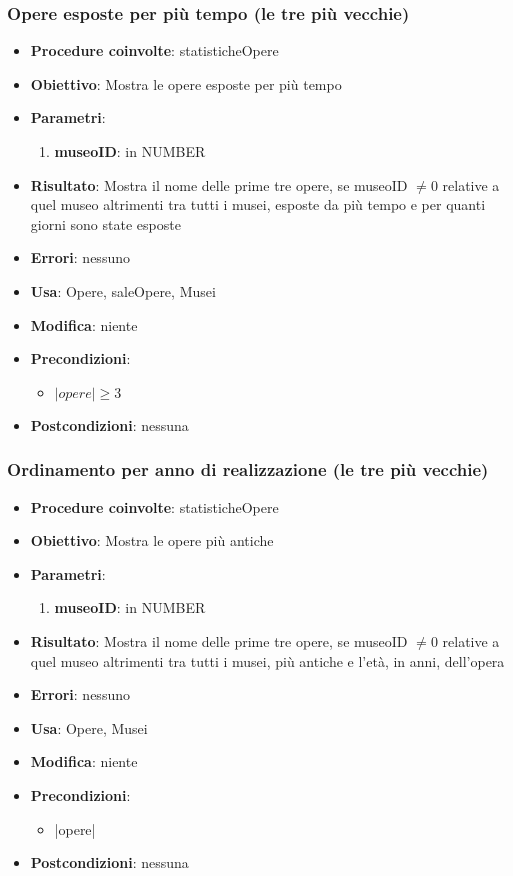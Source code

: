 \subsubsection{Opere esposte per più tempo (le tre più vecchie)}
\begin{itemize}
	\item \textbf{Procedure coinvolte}: statisticheOpere
	\item \textbf{Obiettivo}: Mostra le opere esposte per più tempo
	\item \textbf{Parametri}:
	\begin{enumerate}
		\item \textbf{museoID}: in NUMBER
	\end{enumerate}
	\item \textbf{Risultato}: Mostra il nome delle prime tre opere, se museoID $\neq 0$ relative a quel museo altrimenti tra tutti i musei, esposte da più tempo e per quanti giorni sono state esposte
	\item \textbf{Errori}: nessuno
	\item \textbf{Usa}: Opere, saleOpere, Musei
	\item \textbf{Modifica}: niente
	\item \textbf{Precondizioni}:
	\begin{itemize}
		\item $|opere| \ge 3$ 
	\end{itemize}
	\item \textbf{Postcondizioni}: nessuna
\end{itemize}

\subsubsection{Ordinamento per anno di realizzazione (le tre più vecchie)}
\begin{itemize}
	\item \textbf{Procedure coinvolte}: statisticheOpere
	\item \textbf{Obiettivo}: Mostra le opere più antiche
	\item \textbf{Parametri}:
	\begin{enumerate}
		\item \textbf{museoID}: in NUMBER
	\end{enumerate}
	\item \textbf{Risultato}: Mostra il nome delle prime tre opere, se museoID $\neq 0$ relative a quel museo altrimenti tra tutti i musei, più antiche e l'età, in anni, dell'opera
	\item \textbf{Errori}: nessuno
	\item \textbf{Usa}: Opere, Musei
	\item \textbf{Modifica}: niente
	\item \textbf{Precondizioni}:
	\begin{itemize}
		\item |opere| 
	\end{itemize}
	\item \textbf{Postcondizioni}: nessuna
\end{itemize}
